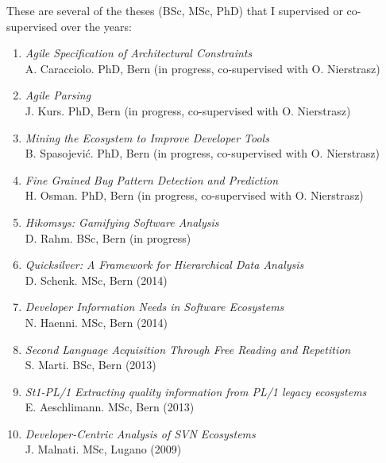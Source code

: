 
\newcommand{\super}[5]{\item \emph{#2}\\ #1. #3, #4 #5}
\newcommand{\inprogr}{{\footnotesize(in progress)}}
\newcommand{\inprogrcosup}{{\footnotesize(in progress, co-supervised with O. Nierstrasz)}}

\newcommand{\yr}[1]{(#1)}

These are several of the theses (BSc, MSc, PhD) that I supervised or co-supervised over the years:

\begin{enumerate}

\super 
	{A. Caracciolo}
	{Agile Specification of Architectural Constraints}
	{PhD}
	{Bern}
	{\inprogrcosup}

\super 
	{J. Kurs}
	{Agile Parsing}
	{PhD}
	{Bern}
	{\inprogrcosup}	

\super 
	{B. Spasojevi\'{c}}
	{Mining the Ecosystem to Improve Developer Tools}
	{PhD}
	{Bern}
	{\inprogrcosup}

\super 
	{H. Osman}
	{Fine Grained Bug Pattern Detection and Prediction}
	{PhD}
	{Bern}
	{\inprogrcosup}	



\super 
	{D. Rahm}
	{Hikomsys: Gamifying Software Analysis}
	{BSc}
	{Bern}
	{\inprogr}


\super 
	{D. Schenk}
	{Quicksilver: A Framework for Hierarchical Data Analysis}
	{MSc}
	{Bern}
	{\yr{2014}}

\super 
	{N. Haenni}
	{Developer Information Needs in Software Ecosystems}
	{MSc}
	{Bern}
	{\yr{2014}}

\super 
	{S. Marti}
	{Second Language Acquisition Through Free Reading and Repetition}
	{BSc}
	{Bern}
	{\yr{2013}}

\super 
	{E. Aeschlimann}
	{St1-PL/1
Extracting quality information from PL/1 legacy ecosystems}
	{MSc}
	{Bern}
	{\yr{2013}}



\super 
	{J. Malnati}
	{Developer-Centric Analysis of SVN Ecosystems}
	{MSc}
	{Lugano}
	{\yr{2009}}



\end{enumerate}